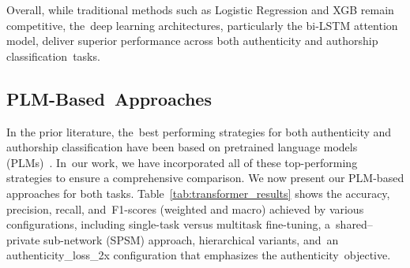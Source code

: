 \documentclass[electronics,article,accept,pdftex,moreauthors,electronics]{Definitions/mdpi}
\begin{document}
Overall, while traditional methods such as Logistic Regression and XGB remain competitive, the~deep learning architectures, particularly the bi-LSTM attention model, deliver superior performance across both authenticity and authorship classification~tasks.


\subsection{PLM-Based~Approaches}
\label{sec:res_transformers}

In the prior literature, the~best performing strategies for both authenticity and authorship classification have been based on pretrained language models (PLMs)~\cite{iceland2023good,su2023adapting}. In~our work, we have incorporated all of these top-performing strategies to ensure a comprehensive comparison. We now present our PLM-based approaches for both tasks. Table~\ref{tab:transformer_results} shows the accuracy, precision, recall, and~F1-scores (weighted and macro) achieved by various configurations, including single-task versus multitask fine-tuning, a~shared--private sub-network (SPSM) approach, hierarchical variants, and~an authenticity\_loss\_2x configuration that emphasizes the authenticity~objective.
\end{document}
